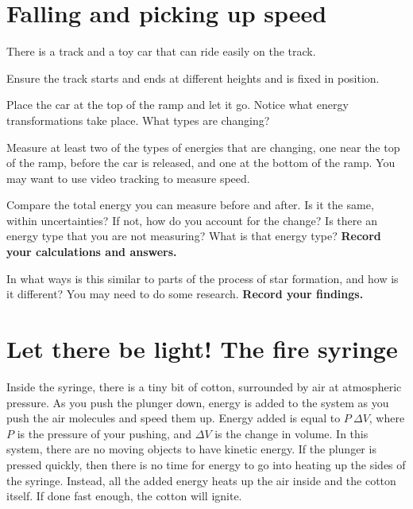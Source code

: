 \section{Falling and picking up speed}

There is a track and a toy car that can ride easily on the track.

\begin{steps}
	\item Ensure the track starts and ends at different heights and is fixed in position.
	
	\item Place the car at the top of the ramp and let it go. Notice what energy transformations take place. What types are changing?
	
	\item Measure at least two of the types of energies that are changing, one near the top of the ramp, before the car is released, and one at the bottom of the ramp. You may want to use video tracking to measure speed.
	
	\item Compare the total energy you can measure before and after. Is it the same, within uncertainties? If not, how do you account for the change? Is there an energy type that you are not measuring? What is that energy type? \textbf{Record your calculations and answers.}
	
	\item In what ways is this similar to parts of the process of star formation, and how is it different? You may need to do some research. \textbf{Record your findings.}
\end{steps}

\section{Let there be light! The fire syringe}

Inside the syringe, there is a tiny bit of cotton, surrounded by air at atmospheric pressure. As you push the plunger down, energy is added to the system as you push the air molecules and speed them up. Energy added is equal to $P \:\Delta V$, where $P$ is the pressure of your pushing, and $\Delta V$ is the change in volume. In this system, there are no moving objects to have kinetic energy. If the plunger is pressed quickly, then there is no time for energy to go into heating up the sides of the syringe. Instead, all the added energy heats up the air inside and the cotton itself. If done fast enough, the cotton will ignite.

